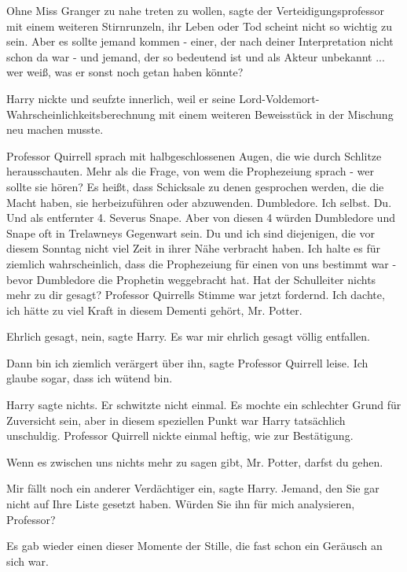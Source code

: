 \glqq{}Ohne Miss Granger zu nahe treten zu wollen\grqq{}, sagte der
Verteidigungsprofessor mit einem weiteren Stirnrunzeln, \glqq{}ihr Leben oder Tod
scheint nicht so wichtig zu sein. Aber es sollte jemand kommen - einer, der nach
deiner Interpretation nicht schon da war - und jemand, der so bedeutend ist und
als Akteur unbekannt ... wer weiß, was er sonst noch getan haben könnte?\grqq{}

Harry nickte und seufzte innerlich, weil er seine
Lord-Voldemort-Wahrscheinlichkeitsberechnung mit einem weiteren Beweisstück in
der Mischung neu machen musste.

Professor Quirrell sprach mit halbgeschlossenen Augen, die wie durch Schlitze
herausschauten. \glqq{}Mehr als die Frage, von wem die Prophezeiung sprach - wer
sollte sie hören? Es heißt, dass Schicksale zu denen gesprochen werden, die die
Macht haben, sie herbeizuführen oder abzuwenden. Dumbledore. Ich selbst. Du. Und
als entfernter 4. Severus Snape. Aber von diesen 4 würden Dumbledore und Snape
oft in Trelawneys Gegenwart sein. Du und ich sind diejenigen, die vor diesem
Sonntag nicht viel Zeit in ihrer Nähe verbracht haben. Ich halte es für ziemlich
wahrscheinlich, dass die Prophezeiung für einen von uns bestimmt war - bevor
Dumbledore die Prophetin weggebracht hat. Hat der Schulleiter nichts mehr zu dir
gesagt?\grqq{} Professor Quirrells Stimme war jetzt fordernd. \glqq{}Ich dachte,
ich hätte zu viel Kraft in diesem Dementi gehört, Mr. Potter.\grqq{}

\glqq{}Ehrlich gesagt, nein\grqq{}, sagte Harry. \glqq{}Es war mir ehrlich gesagt
völlig entfallen.\grqq{}

\glqq{}Dann bin ich ziemlich verärgert über ihn\grqq{}, sagte Professor Quirrell
leise. \glqq{}Ich glaube sogar, dass ich wütend bin.\grqq{}

Harry sagte nichts. Er schwitzte nicht einmal. Es mochte ein schlechter Grund
für Zuversicht sein, aber in diesem speziellen Punkt war Harry tatsächlich
unschuldig. Professor Quirrell nickte einmal heftig, wie zur Bestätigung.

\glqq{}Wenn es zwischen uns nichts mehr zu sagen gibt, Mr. Potter, darfst du
gehen.\grqq{}

\glqq{}Mir fällt noch ein anderer Verdächtiger ein\grqq{}, sagte Harry. \glqq{}
Jemand, den Sie gar nicht auf Ihre Liste gesetzt haben. Würden Sie ihn für mich
analysieren, Professor?\grqq{}

Es gab wieder einen dieser Momente der Stille, die fast schon ein Geräusch an
sich war.

